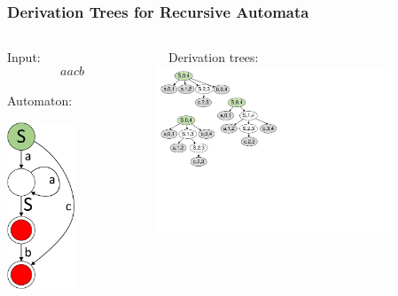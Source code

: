 \documentclass{beamer}
\begin{document}
	\begin{frame} 
		\frametitle{Derivation Trees for Recursive Automata}
		\begin{columns}
			\begin{column}{3.7cm}
				Input: $$aacb$$ \\
				\vspace{10pt}
				Automaton: \\
				\vspace{5pt}
				\begin{center}
					\includegraphics[width=2cm]{pictures/G0minimizedAutomaton.pdf}
				\end{center}
			\end{column}
		
     		\begin{column}{6cm}
     			\ \ Derivation trees:\\
     			\vspace{5pt}
     			\includegraphics[width=7cm]{pictures/G0trees.pdf}
			\end{column}
		
		\end{columns}
	\end{frame}
	
\end{document}
